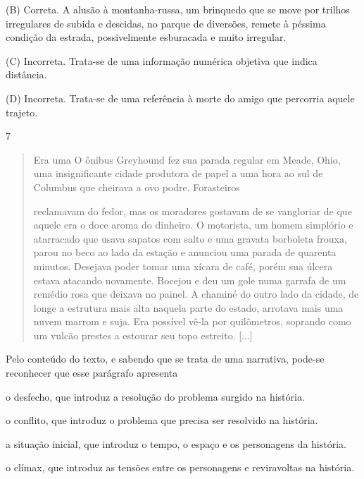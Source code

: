 (B) Correta. A alusão à montanha-russa, um brinquedo que se move por
trilhos irregulares de subida e descidas, no parque de diversões, remete
à péssima condição da estrada, possivelmente esburacada e muito
irregular.

(C) Incorreta. Trata-se de uma informação numérica objetiva que indica
distância.

(D) Incorreta. Trata-se de uma referência à morte do amigo que percorria
aquele trajeto.

\num{7}

\begin{quote}
Era uma O ônibus Greyhound fez sua parada regular em Meade, Ohio, uma
insignificante cidade produtora de papel a uma hora ao sul de Columbus
que cheirava a ovo podre. Forasteiros

reclamavam do fedor, mas os moradores gostavam de se vangloriar de que
aquele era o doce aroma do dinheiro. O motorista, um homem simplório e
atarracado que usava sapatos com salto e uma gravata borboleta frouxa,
parou no beco ao lado da estação e anunciou uma parada de quarenta
minutos. Desejava poder tomar uma xícara de café, porém sua úlcera
estava atacando novamente. Bocejou e deu um gole numa garrafa de um
remédio rosa que deixava no painel. A chaminé do outro lado da cidade,
de longe a estrutura mais alta naquela parte do estado, arrotava mais
uma nuvem marrom e suja. Era possível vê-la por quilômetros, soprando
como um vulcão prestes a estourar seu topo estreito.
{[}...{]}
\end{quote}


Pelo conteúdo do texto, e sabendo que se trata de uma narrativa, pode-se
reconhecer que esse parágrafo apresenta

\begin{escolha}
\item o desfecho, que introduz a resolução do problema surgido na história.

\item o conflito, que introduz o problema que precisa ser resolvido na
história.

\item a situação inicial, que introduz o tempo, o espaço e os personagens
da história.

\item o clímax, que introduz as tensões entre os personagens e reviravoltas
na história.
\end{escolha}

